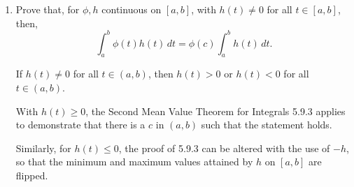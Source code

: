 \documentclass[../hw4]{subfiles}
\begin{document}
\begin{enumerate}[label= (\alph*)]
\begin{proof}
        By the Cauchy Mean Value Theorem, $\exists c \in (a,b)$ such that,
        \begin{align*}
            G'(c)[F(b)-F(a)]&=F'(c)[G(b)-G(a)]\\
            g(c)[F(b)-F(a)]&=f(c)[G(b)-G(a)].\\
        \end{align*}

        By the Fundamental Theorem of Calculus, for $F'(x)=f(x)$, $F(b)-F(a)=\int_{a}^{b}f(t)\,dt$. The same holds for $G'(x)$.

        So, for some $c$ in $(a,b)$, \[g(c)\int_{a}^{b}f(t)\,dt = f(c)\int_{a}^{b}g(t)\,dt.\]
    \end{proof}

    \item Prove that, for $\phi,h$ continuous on $[a,b]$, with $h(t)\neq0$ for all $t\in[a,b]$, then, \[\int_{a}^{b}\phi(t)h(t)\,dt=\phi(c)\int_{a}^{b}h(t)\,dt.\]
    
    If $h(t)\neq0$ for all $t\in(a,b)$, then $h(t)>0$ or $h(t)<0$ for all $t\in(a,b)$.

    With $h(t)\geq0$, the Second Mean Value Theorem for Integrals 5.9.3 applies to demonstrate that there is a $c$ in $(a,b)$ such that the statement holds.

    Similarly, for $h(t)\leq0$, the proof of 5.9.3 can be altered with the use of $-h$, so that the minimum and maximum values attained by $h$ on $[a,b]$ are flipped.





\end{enumerate}
\end{document}
